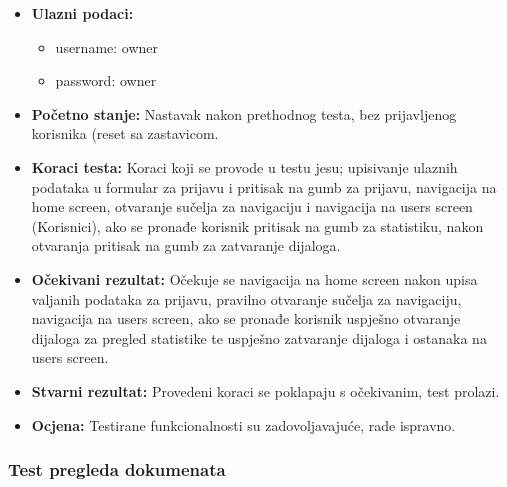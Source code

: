 			\begin{itemize}
				
				\item{\textbf{Ulazni podaci:}}
				\begin{itemize}
					\item{username: owner}
					\item{password: owner}
				\end{itemize}
				
				\item{\textbf{Početno stanje:} Nastavak nakon prethodnog testa, bez prijavljenog korisnika (reset sa zastavicom.}
				
				\item{\textbf{Koraci testa:} Koraci koji se provode u testu jesu; upisivanje ulaznih podataka u formular za prijavu i pritisak na gumb za prijavu, navigacija na home screen, otvaranje sučelja za navigaciju i navigacija na users screen (Korisnici), ako se pronađe korisnik pritisak na gumb za statistiku, nakon otvaranja pritisak na gumb za zatvaranje dijaloga.}
				
				\item{\textbf{Očekivani rezultat:} Očekuje se navigacija na home screen nakon upisa valjanih podataka za prijavu, pravilno otvaranje sučelja za navigaciju, navigacija na users screen, ako se pronađe korisnik uspješno otvaranje dijaloga za pregled statistike te uspješno zatvaranje dijaloga i ostanaka na users screen.}
				
				\item{\textbf{Stvarni rezultat:} Provedeni koraci se poklapaju s očekivanim, test prolazi.}
				
				\item{\textbf{Ocjena:} Testirane funkcionalnosti su zadovoljavajuće, rade ispravno.}
				
			\end{itemize}
			
			\subsubsection{Test pregleda dokumenata}
			
